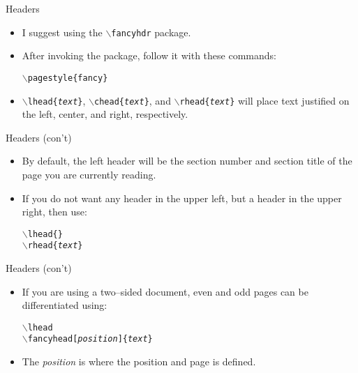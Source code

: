 \documentclass[pdf]{prosper}
\begin{document}
\begin{slide}{Headers}
	\begin{itemize}
		\item I suggest using the \texttt{$\backslash$fancyhdr} package.
		\item After invoking the package, follow it with these commands:
			\begin{center}
				\texttt{$\backslash$pagestyle\{fancy\}}
			\end{center}
		\item \texttt{$\backslash$lhead\{\textit{text}\}}, \texttt{$\backslash$chead\{\textit{text}\}}, and \texttt{$\backslash$rhead\{\textit{text}\}} will place text justified on the left, center, and right, respectively.
	\end{itemize}
\end{slide}
\begin{slide}{Headers (con't)}
	\begin{itemize}
		\item By default, the left header will be the section number and section title of the page you are currently reading.
		\item If you do not want any header in the upper left, but a header in the upper right, then use:
			\begin{center}
				\texttt{$\backslash$lhead\{\}} \\
				\texttt{$\backslash$rhead\{\textit{text}\}}
			\end{center}
	\end{itemize}
\end{slide}
\begin{slide}{Headers (con't)}
	\begin{itemize}
		\item If you are using a two--sided document, even and odd pages can be differentiated using:
			\begin{center}
				\texttt{$\backslash$lhead{}} \\
				\texttt{$\backslash$fancyhead[\textit{position}]\{\textit{text}\}}
			\end{center}
		\item The \textit{position} is where the position and page is defined.
	\end{itemize}
\end{slide}
\end{document}
